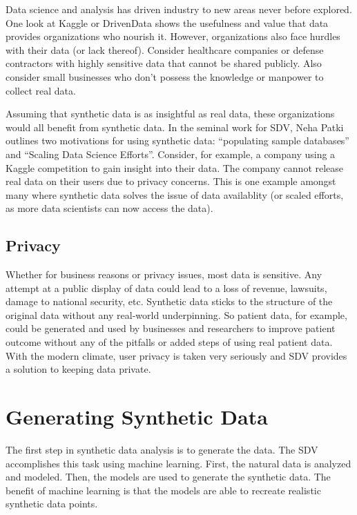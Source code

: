 Data science and analysis has driven industry to new areas never before explored. One look at Kaggle or DrivenData shows the usefulness and value that data provides organizations who nourish it. However, organizations also face hurdles with their data (or lack thereof). Consider healthcare companies or defense contractors with highly sensitive data that cannot be shared publicly. Also consider small businesses who don't possess the knowledge or manpower to collect real data.

Assuming that synthetic data is as insightful as real data, these organizations would all benefit from synthetic data. In the seminal work for SDV, Neha Patki outlines two motivations for using synthetic data: ``populating sample databases'' and ``Scaling Data Science Efforts''\cite{}. Consider, for example, a company using a Kaggle competition to gain insight into their data. The company cannot release real data on their users due to privacy concerns. This is one example amongst many where synthetic data solves the issue of data availablity (or scaled efforts, as more data scientists can now access the data). %

\subsection{Privacy}

Whether for business reasons or privacy issues, most data is sensitive. Any attempt at a public display of data could lead to a loss of revenue, lawsuits, damage to national security, etc. Synthetic data sticks to the structure of the original data without any real-world underpinning. So patient data, for example, could be generated and used by businesses and researchers to improve patient outcome without any of the pitfalls or added steps of using real patient data. With the modern climate, user privacy is taken very seriously and SDV provides a solution to keeping data private. %

\section{Generating Synthetic Data}

The first step in synthetic data analysis is to generate the data. The SDV accomplishes this task using machine learning. First, the natural data is analyzed and modeled. Then, the models are used to generate the synthetic data. The benefit of machine learning is that the models are able to recreate realistic synthetic data points.

